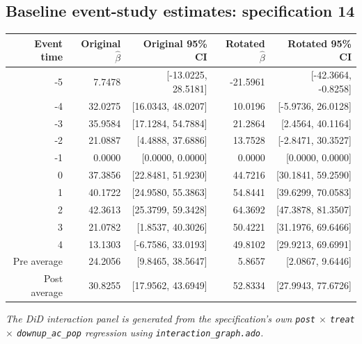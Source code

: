 \documentclass[10pt]{article}
\begin{document}
\subsection*{Baseline event-study estimates: specification 14}
\begin{center}
\scriptsize
\begin{tabular}{r rr rr}
\toprule
Event time & Original $\hat\beta$ & Original 95\% CI & Rotated $\hat\beta$ & Rotated 95\% CI \\
\midrule
-5 & 7.7478 & [-13.0225, 28.5181] & -21.5961 & [-42.3664, -0.8258] \\
-4 & 32.0275 & [16.0343, 48.0207] & 10.0196 & [-5.9736, 26.0128] \\
-3 & 35.9584 & [17.1284, 54.7884] & 21.2864 & [2.4564, 40.1164] \\
-2 & 21.0887 & [4.4888, 37.6886] & 13.7528 & [-2.8471, 30.3527] \\
-1 & 0.0000 & [0.0000, 0.0000] & 0.0000 & [0.0000, 0.0000] \\
0 & 37.3856 & [22.8481, 51.9230] & 44.7216 & [30.1841, 59.2590] \\
1 & 40.1722 & [24.9580, 55.3863] & 54.8441 & [39.6299, 70.0583] \\
2 & 42.3613 & [25.3799, 59.3428] & 64.3692 & [47.3878, 81.3507] \\
3 & 21.0782 & [1.8537, 40.3026] & 50.4221 & [31.1976, 69.6466] \\
4 & 13.1303 & [-6.7586, 33.0193] & 49.8102 & [29.9213, 69.6991] \\
\midrule
Pre average & 24.2056 & [9.8465, 38.5647] & 5.8657 & [2.0867, 9.6446] \\
Post average & 30.8255 & [17.9562, 43.6949] & 52.8334 & [27.9943, 77.6726] \\
\bottomrule
\end{tabular}
\end{center}
\medskip
\textit{The DiD interaction panel is generated from the specification's own \texttt{post} $\times$ \texttt{treat} $\times$ \texttt{downup\_ac\_pop} regression using \texttt{interaction\_graph.ado}.}
\clearpage
\end{document}
